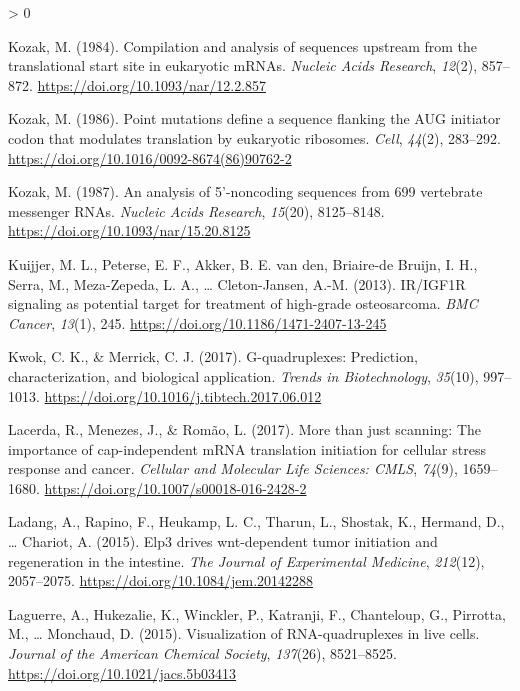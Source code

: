 \documentclass[
  12pt,
  openany]{book}
\newlength{\cslhangindent}
\newenvironment{CSLReferences}[2] %
 {%
  \setlength{\parindent}{0pt}
  \ifodd #1 \everypar{\setlength{\hangindent}{\cslhangindent}}\ignorespaces\fi
  \ifnum #2 > 0
  \setlength{\parskip}{#2\baselineskip}
  \fi
 }%
 {}
\begin{document}
\begin{CSLReferences}{1}{0}
\leavevmode\hypertarget{ref-Kozak1984}{}%
Kozak, M. (1984). Compilation and analysis of sequences upstream from the translational start site in eukaryotic {mRNAs}. \emph{Nucleic Acids Research}, \emph{12}(2), 857--872. \url{https://doi.org/10.1093/nar/12.2.857}

\leavevmode\hypertarget{ref-Kozak1986}{}%
Kozak, M. (1986). Point mutations define a sequence flanking the {AUG} initiator codon that modulates translation by eukaryotic ribosomes. \emph{Cell}, \emph{44}(2), 283--292. \url{https://doi.org/10.1016/0092-8674(86)90762-2}

\leavevmode\hypertarget{ref-Kozak1987}{}%
Kozak, M. (1987). An analysis of 5'-noncoding sequences from 699 vertebrate messenger {RNAs}. \emph{Nucleic Acids Research}, \emph{15}(20), 8125--8148. \url{https://doi.org/10.1093/nar/15.20.8125}

\leavevmode\hypertarget{ref-Kuijjer2013}{}%
Kuijjer, M. L., Peterse, E. F., Akker, B. E. van den, Briaire-de Bruijn, I. H., Serra, M., Meza-Zepeda, L. A., \ldots{} Cleton-Jansen, A.-M. (2013). {IR}/{IGF}1R signaling as potential target for treatment of high-grade osteosarcoma. \emph{{BMC} Cancer}, \emph{13}(1), 245. \url{https://doi.org/10.1186/1471-2407-13-245}

\leavevmode\hypertarget{ref-Kwok2017}{}%
Kwok, C. K., \& Merrick, C. J. (2017). G-quadruplexes: Prediction, characterization, and biological application. \emph{Trends in Biotechnology}, \emph{35}(10), 997--1013. \url{https://doi.org/10.1016/j.tibtech.2017.06.012}

\leavevmode\hypertarget{ref-Lacerda2017}{}%
Lacerda, R., Menezes, J., \& Romão, L. (2017). More than just scanning: The importance of cap-independent {mRNA} translation initiation for cellular stress response and cancer. \emph{Cellular and Molecular Life Sciences: {CMLS}}, \emph{74}(9), 1659--1680. \url{https://doi.org/10.1007/s00018-016-2428-2}

\leavevmode\hypertarget{ref-Ladang2015}{}%
Ladang, A., Rapino, F., Heukamp, L. C., Tharun, L., Shostak, K., Hermand, D., \ldots{} Chariot, A. (2015). Elp3 drives wnt-dependent tumor initiation and regeneration in the intestine. \emph{The Journal of Experimental Medicine}, \emph{212}(12), 2057--2075. \url{https://doi.org/10.1084/jem.20142288}

\leavevmode\hypertarget{ref-Laguerre2015}{}%
Laguerre, A., Hukezalie, K., Winckler, P., Katranji, F., Chanteloup, G., Pirrotta, M., \ldots{} Monchaud, D. (2015). Visualization of {RNA}-quadruplexes in live cells. \emph{Journal of the American Chemical Society}, \emph{137}(26), 8521--8525. \url{https://doi.org/10.1021/jacs.5b03413}


\end{CSLReferences}
\end{document}
